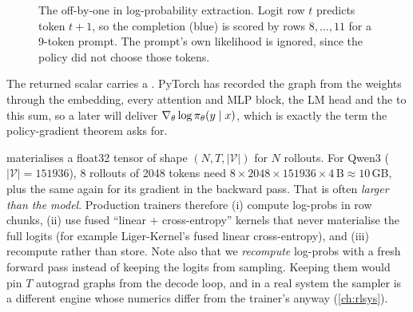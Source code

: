 \begin{figure}[ht]
\centering
{}
\caption{The off-by-one in log-probability extraction. Logit row $t$ predicts token $t+1$,
so the completion (blue) is scored by rows $8,\dots,11$ for a 9-token prompt. The
prompt's own likelihood is ignored, since the policy did not choose those tokens.}
\label{fig:grpo:shift}
\end{figure}

The returned scalar carries a . PyTorch has recorded the graph from the
weights through the embedding, every attention and MLP block, the LM head and the
 to this sum, so a later  will deliver
$\nabla_\theta\log\pi_\theta(y\mid x)$, which is exactly the term the policy-gradient theorem asks for.

\begin{systemslens}
 materialises a float32 tensor of shape
$(N, T, |\mathcal V|)$ for $N$ rollouts. For Qwen3 ($|\mathcal V|=\num{151936}$), 8 rollouts
of 2048 tokens need $8\times2048\times\num{151936}\times4\,\text{B}\approx10$\,GB, plus the
same again for its gradient in the backward pass. That is often \emph{larger than the
model}. Production trainers therefore (i) compute log-probs in row chunks, (ii) use fused
``linear + cross-entropy'' kernels that never materialise the full logits (for example
Liger-Kernel's fused linear cross-entropy), and (iii) recompute rather than store. Note
also that we \emph{recompute} log-probs with a fresh forward pass instead of keeping the
logits from sampling. Keeping them would pin $T$ autograd graphs from the decode loop,
and in a real system the sampler is a different engine whose numerics differ from the
trainer's anyway (\cref{ch:rlsys}).
\end{systemslens}

